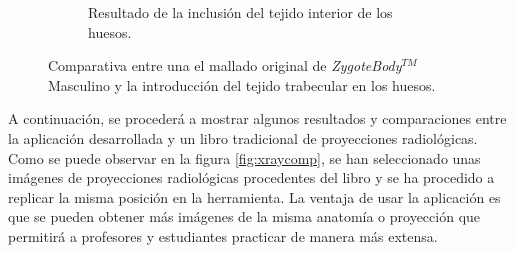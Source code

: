 \begin{figure}[h]
\begin{subfigure}[b]{0.45\linewidth}
        \caption{Resultado de la inclusión del tejido interior de los huesos.}
    \end{subfigure}
    \caption{\label{fig:bonecompare} Comparativa entre una el mallado original de \emph{ZygoteBody}$^{TM}$ Masculino y la introducción del tejido trabecular en los huesos.}
   \end{figure}



A continuación, se procederá a mostrar algunos resultados y comparaciones entre la aplicación desarrollada y un libro tradicional de proyecciones radiológicas.
Como se puede observar en la figura \ref{fig:xraycomp}, se han seleccionado unas imágenes de proyecciones radiológicas procedentes del libro \cite{carver2012medical} y se ha procedido a replicar la misma posición en la herramienta. La ventaja de usar la aplicación es que se pueden obtener más imágenes de la misma anatomía o proyección que permitirá a profesores y estudiantes practicar de manera más extensa. 



